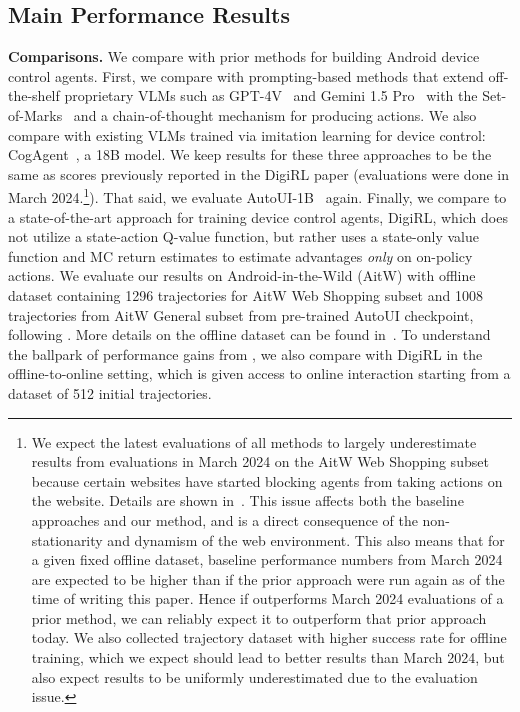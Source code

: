 \subsection{Main Performance Results}
\vspace{-0.1cm}
\textbf{Comparisons.} We compare \ourmethod{} with prior methods for building Android device control agents. First, we compare \ourmethod{} with prompting-based methods that extend off-the-shelf proprietary VLMs such as GPT-4V~\citep{openai2024gpt4vtechnicalreport} and Gemini 1.5 Pro~\citep{geminiteam2024geminifamilyhighlycapable} with the Set-of-Marks~\citep{yang2023setofmarkpromptingunleashesextraordinary} and a chain-of-thought mechanism for producing actions.  We also compare with existing VLMs trained via imitation learning for device control: CogAgent~\citep{hong2023cogagentvisuallanguagemodel}, a 18B model. We keep results for these three approaches to be the same as scores previously reported in the DigiRL paper (evaluations were done in March 2024.\footnote{We expect the latest evaluations of all methods to largely underestimate results from evaluations in March 2024 on the AitW Web Shopping subset because certain websites have started blocking agents from taking actions on the website. Details are shown in~. This issue affects both the baseline approaches and our method, and is a direct consequence of the non-stationarity and dynamism of the web environment. This also means that for a given fixed offline dataset, baseline performance numbers from March 2024 are expected to be higher than if the prior approach were run again as of the time of writing this paper. Hence if \ourmethod{} outperforms March 2024 evaluations of a prior method, we can reliably expect it to outperform that prior approach today. We also collected trajectory dataset with higher success rate for offline training, which we expect should lead to better results than March 2024, but also expect results to be uniformly underestimated due to the evaluation issue.}). That said, we evaluate AutoUI-1B~\citep{zhang2023youonlylookatscreens} again. Finally, we compare to a state-of-the-art approach for training device control agents, DigiRL, which does not utilize a state-action Q-value function, but rather uses a state-only value function and MC return estimates to estimate advantages \emph{only} on on-policy actions. We evaluate our results on Android-in-the-Wild (AitW) with offline dataset containing 1296 trajectories for AitW Web Shopping subset and 1008 trajectories from AitW General subset from pre-trained AutoUI checkpoint, following \citet{bai2024digirltraininginthewilddevicecontrol}. More details on the offline dataset can be found in~. To understand the ballpark of performance gains from \ourmethod{}, we also compare with DigiRL in the offline-to-online setting, which is given access to online interaction starting from a dataset of 512 initial trajectories.


